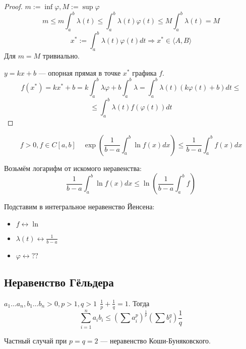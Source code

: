\begin{proof}
    $m:=\inf \varphi, M:=\sup \varphi$
    $$m\leq m\int_a^b \lambda(t) \leq \int_a^b \lambda(t)\varphi(t)\leq M\int_a^b \lambda(t) = M$$
    $$x^*:=\int_a^b \lambda(t)\varphi(t)dt \Rightarrow x^*\in\langle A,B\rangle$$
    Для $m=M$ тривиально.

    $y=kx+b$ --- опорная прямая в точке $x^*$ графика $f$.
    $$f(x^*)=kx^*+b=k\int_a^b \lambda\varphi + b\int_a^b\lambda=\int_a^b \lambda(t)(k\varphi(t)+b)dt\leq$$
    $$\leq \int_a^b \lambda(t)f(\varphi(t))dt$$
\end{proof}

\begin{example}
    $$f>0, f\in C[a,b] \quad \exp\left(\frac{1}{b-a} \int_a^b \ln f(x)dx \right) \leq \frac{1}{b-a}\int_a^b f(x)dx$$


    Возьмём логарифм от искомого неравенства:
    $$\frac{1}{b-a}\int_a^b \ln f(x)dx \leq \ln\left(\frac{1}{b-a}\int_a^b f\right)$$

    Подставим в интегральное неравенство Йенсена:
    \begin{itemize}
        \item $f\leftrightarrow \ln$
        \item $\lambda(t)\leftrightarrow\frac{1}{b-a}$
        \item $\varphi\leftrightarrow ??$
    \end{itemize}
\end{example}

\subsection{Неравенство Гёльдера}

$a_1\ldots a_n, b_1\ldots b_n > 0, p>1, q>1 \ \ \frac{1}{p}+\frac{1}{q}=1$. Тогда
$$\sum_{i=1}^n a_ib_i \leq \left(\sum a_i^p\right)^{\frac{1}{p}}\left(\sum b_i^q\right)\frac{1}{q}$$

Частный случай при $p=q=2$ --- неравенство Коши-Буняковского.

